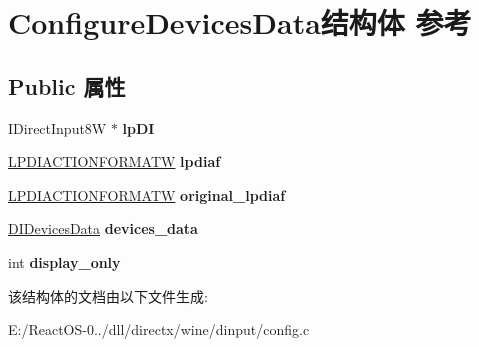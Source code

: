 \hypertarget{struct_configure_devices_data}{}\section{Configure\+Devices\+Data结构体 参考}
\label{struct_configure_devices_data}
\subsection*{Public 属性}
\begin{DoxyCompactItemize}
\item 
\mbox{\label{struct_configure_devices_data_a19b81efac2729814799babc6c8b20e44}} 
I\+Direct\+Input8W $\ast$ {\bfseries lp\+DI}
\item 
\mbox{\label{struct_configure_devices_data_ae936f404059a42ea45db31ae6c7c9633}} 
\hyperlink{struct___d_i_a_c_t_i_o_n_f_o_r_m_a_t_w}{L\+P\+D\+I\+A\+C\+T\+I\+O\+N\+F\+O\+R\+M\+A\+TW} {\bfseries lpdiaf}
\item 
\mbox{\label{struct_configure_devices_data_a09cd3dd2323310f8781672f44d435c13}} 
\hyperlink{struct___d_i_a_c_t_i_o_n_f_o_r_m_a_t_w}{L\+P\+D\+I\+A\+C\+T\+I\+O\+N\+F\+O\+R\+M\+A\+TW} {\bfseries original\+\_\+lpdiaf}
\item 
\mbox{\label{struct_configure_devices_data_ab6d8e4505a953c58364ddb60d0acfa72}} 
\hyperlink{struct_d_i_devices_data}{D\+I\+Devices\+Data} {\bfseries devices\+\_\+data}
\item 
\mbox{\label{struct_configure_devices_data_ad5149cd1e7f45d4f917dcfbb5453ba7e}} 
int {\bfseries display\+\_\+only}
\end{DoxyCompactItemize}


该结构体的文档由以下文件生成\+:\begin{DoxyCompactItemize}
\item 
E\+:/\+React\+O\+S-\/0../dll/directx/wine/dinput/config.\+c\end{DoxyCompactItemize}

